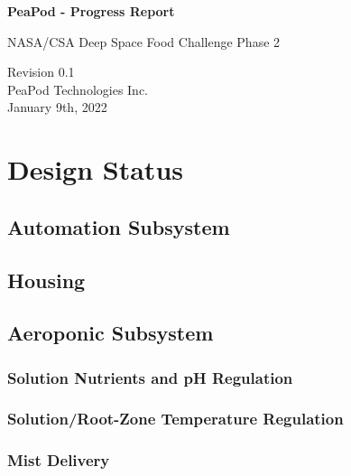 \documentclass{report}
\begin{document}
\begin{titlepage}
    \begin{center}
        \vspace*{1.2cm}

        \textbf{\large{PeaPod - Progress Report}}

        \vspace{0.5cm}

        NASA/CSA Deep Space Food Challenge Phase 2

        \vfill
        
        \vspace{.75cm}

        Revision 0.1\\
        PeaPod Technologies Inc.\\
        January 9th, 2022

    \end{center}
\end{titlepage}

\thispagestyle{plain}

\tableofcontents
\newpage

\section{Design Status}
\subsection{Automation Subsystem}
\subsection{Housing}
\subsection{Aeroponic Subsystem}
\subsubsection{Solution Nutrients and pH Regulation}
\subsubsection{Solution/Root-Zone Temperature Regulation}
\subsubsection{Mist Delivery}
\end{document}
